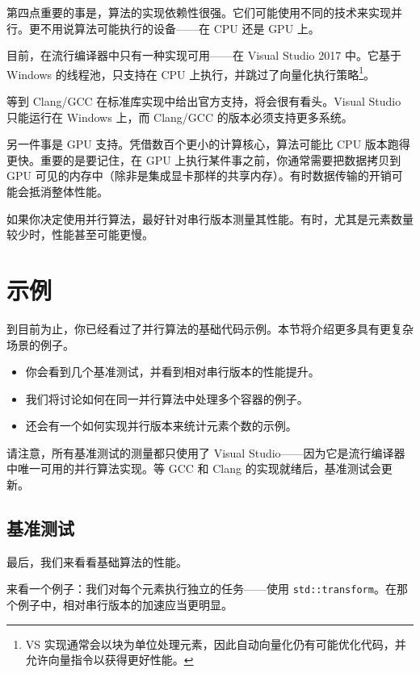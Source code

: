 第四点重要的事是，算法的实现依赖性很强。它们可能使用不同的技术来实现并行。更不用说算法可能执行的设备——在 CPU 还是 GPU 上。

目前，在流行编译器中只有一种实现可用——在 Visual Studio 2017 中。它基于 Windows 的线程池，只支持在 CPU 上执行，并跳过了向量化执行策略\footnote{VS 实现通常会以块为单位处理元素，因此自动向量化仍有可能优化代码，并允许向量指令以获得更好性能。}。

等到 Clang/GCC 在标准库实现中给出官方支持，将会很有看头。Visual Studio 只能运行在 Windows 上，而 Clang/GCC 的版本必须支持更多系统。

另一件事是 GPU 支持。凭借数百个更小的计算核心，算法可能比 CPU 版本跑得更快。重要的是要记住，在 GPU 上执行某件事之前，你通常需要把数据拷贝到 GPU 可见的内存中（除非是集成显卡那样的共享内存）。有时数据传输的开销可能会抵消整体性能。

\begin{myInfoBox}
如果你决定使用并行算法，最好针对串行版本测量其性能。有时，尤其是元素数量较少时，性能甚至可能更慢。
\end{myInfoBox}


\section{示例}

到目前为止，你已经看过了并行算法的基础代码示例。本节将介绍更多具有更复杂场景的例子。

\begin{itemize}
\item 你会看到几个基准测试，并看到相对串行版本的性能提升。
\item 我们将讨论如何在同一并行算法中处理多个容器的例子。
\item 还会有一个如何实现并行版本来统计元素个数的示例。
\end{itemize}

请注意，所有基准测试的测量都只使用了 Visual Studio——因为它是流行编译器中唯一可用的并行算法实现。等 GCC 和 Clang 的实现就绪后，基准测试会更新。


\subsection{基准测试}

最后，我们来看看基础算法的性能。

来看一个例子：我们对每个元素执行独立的任务——使用 \texttt{std::transform}。在那个例子中，相对串行版本的加速应当更明显。

